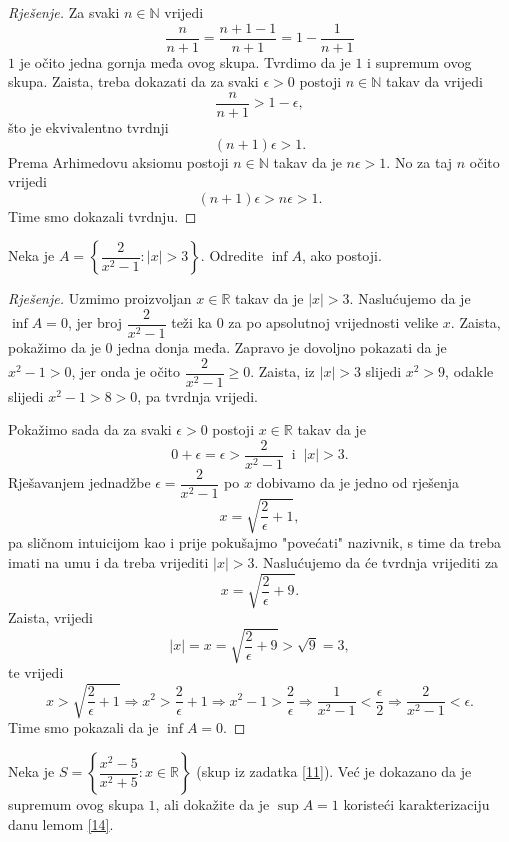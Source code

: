 \begin{proof}[Rješenje]
Za svaki $n\in \mathbb{N}$ vrijedi
$$\dfrac{n}{n+1}=\dfrac{n+1-1}{n+1}=1-\dfrac{1}{n+1}$$
$1$ je očito jedna gornja međa ovog skupa. Tvrdimo da je $1$ i supremum ovog skupa. Zaista, treba dokazati da za svaki $\epsilon>0$ postoji $n\in \mathbb{N}$ takav da vrijedi
$$\dfrac{n}{n+1}>1-\epsilon,$$
što je ekvivalentno tvrdnji
$$(n+1)\epsilon>1.$$
Prema Arhimedovu aksiomu postoji $n\in \mathbb{N}$ takav da je $n\epsilon>1$. No za taj $n$ očito vrijedi $$(n+1)\epsilon>n\epsilon>1.$$ Time smo dokazali tvrdnju.
\end{proof}
\begin{exercise}
Neka je $A=\left\{\dfrac{2}{x^2-1} : |x|>3\right\}$. Odredite $\inf{A}$, ako postoji.
\end{exercise}
\begin{proof}[Rješenje]
Uzmimo proizvoljan  $x\in \mathbb{R}$ takav da je $|x|>3$. Naslućujemo da je $\inf{A}=0$, jer broj $\dfrac{2}{x^2-1}$ teži ka $0$ za po apsolutnoj vrijednosti velike $x$. Zaista, pokažimo da je $0$ jedna donja međa. Zapravo je dovoljno pokazati da je $x^2-1>0$, jer onda je očito $\dfrac{2}{x^2-1}\geq 0$. Zaista, iz $|x|>3$ slijedi $x^2>9$, odakle slijedi $x^2-1>8>0$, pa tvrdnja vrijedi. 

Pokažimo sada da za svaki $\epsilon >0$ postoji $x\in \mathbb{R}$ takav da je $$0+\epsilon=\epsilon>\dfrac{2}{x^2-1}\;\;\text{i}\;\; |x|>3.$$ Rješavanjem jednadžbe $\epsilon=\dfrac{2}{x^2-1}$ po $x$ dobivamo da je jedno od rješenja $$x=\sqrt{\dfrac{2}{\epsilon}+1},$$ pa sličnom intuicijom kao i prije pokušajmo "povećati" nazivnik, s time da treba imati na umu i da treba vrijediti $|x|>3$. Naslućujemo da će tvrdnja vrijediti za $$x=\sqrt{\dfrac{2}{\epsilon}+9}.$$ Zaista, vrijedi $$|x|=x=\sqrt{\dfrac{2}{\epsilon}+9}>\sqrt{9}=3,$$ te vrijedi
$$x>\sqrt{\dfrac{2}{\epsilon}+1}\Rightarrow x^2>\dfrac{2}{\epsilon}+1\Rightarrow x^2-1>\dfrac{2}{\epsilon}\Rightarrow \dfrac{1}{x^2-1}<\dfrac{\epsilon}{2}\Rightarrow \dfrac{2}{x^2-1}<\epsilon.$$
Time smo pokazali da je $\inf{A}=0$.
\end{proof}
\begin{exercise}
Neka je $S=\left\{\dfrac{x^2-5}{x^2+5} : x\in \mathbb{R}\right\}$ (skup iz zadatka \ref{11}). Već je dokazano da je supremum ovog skupa $1$, ali dokažite da je $\sup{A}=1$ koristeći karakterizaciju danu lemom \ref{14}.
\end{exercise}
